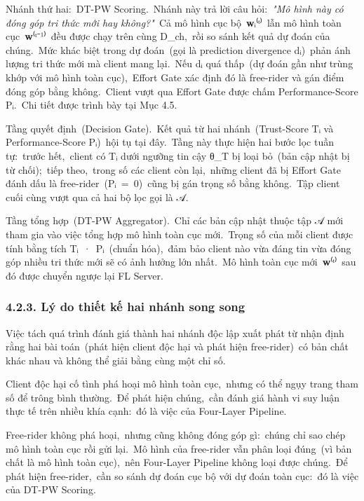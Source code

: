 Nhánh thứ hai:~DT-PW Scoring.~Nhánh này trả lời câu hỏi:~\emph{"Mô hình này có đóng góp tri thức mới hay không?"}~Cả mô hình cục bộ~\textbf{w}ᵢ⁽ᵗ⁾~lẫn mô hình toàn cục~\textbf{w}⁽ᵗ⁻¹⁾~đều được chạy trên cùng D\_ch,~rồi so sánh kết quả dự đoán của chúng.~Mức khác biệt trong dự đoán~(gọi là prediction divergence dᵢ)~phản ánh lượng tri thức mới mà client mang lại.~Nếu dᵢ quá thấp~(dự đoán gần như trùng khớp với mô hình toàn cục),~Effort Gate xác định đó là free-rider và gán điểm đóng góp bằng không.~Client vượt qua Effort Gate được chấm Performance-Score Pᵢ.~Chi tiết được trình bày tại Mục 4.5.

Tầng quyết định~(Decision Gate).~Kết quả từ hai nhánh~(Trust-Score Tᵢ và Performance-Score Pᵢ)~hội tụ tại đây.~Tầng này thực hiện hai bước lọc tuần tự:~trước hết,~client có Tᵢ dưới ngưỡng tin cậy θ\_T bị loại bỏ~(bản cập nhật bị từ chối);~tiếp theo,~trong số các client còn lại,~những client đã bị Effort Gate đánh dấu là free-rider~(Pᵢ~=~0)~cũng bị gán trọng số bằng không.~Tập client cuối cùng vượt qua cả hai bộ lọc gọi là 𝒜.

Tầng tổng hợp~(DT-PW Aggregator).~Chỉ các bản cập nhật thuộc tập 𝒜 mới tham gia vào việc tổng hợp mô hình toàn cục mới.~Trọng số của mỗi client được tính bằng tích Tᵢ~·~Pᵢ~(chuẩn hóa),~đảm bảo client nào vừa đáng tin vừa đóng góp nhiều tri thức mới sẽ có ảnh hưởng lớn nhất.~Mô hình toàn cục mới~\textbf{w}⁽ᵗ⁾~sau đó được chuyển ngược lại FL Server.

\subsubsection{4.2.3. Lý do thiết kế hai nhánh song song}\label{luxfd-do-thiux1ebft-kux1ebf-hai-nhuxe1nh-song-song}

Việc tách quá trình đánh giá thành hai nhánh độc lập xuất phát từ nhận định rằng hai bài toán~(phát hiện client độc hại và phát hiện free-rider)~có bản chất khác nhau và không thể giải bằng cùng một chỉ số.

Client độc hại cố tình phá hoại mô hình toàn cục,~nhưng có thể ngụy trang tham số để trông bình thường.~Để phát hiện chúng,~cần đánh giá hành vi suy luận thực tế trên nhiều khía cạnh:~đó là việc của Four-Layer Pipeline.

Free-rider không phá hoại,~nhưng cũng không đóng góp gì:~chúng chỉ sao chép mô hình toàn cục rồi gửi lại.~Mô hình của free-rider vẫn phân loại đúng~(vì bản chất là mô hình toàn cục),~nên Four-Layer Pipeline không loại được chúng.~Để phát hiện free-rider,~cần so sánh dự đoán cục bộ với dự đoán toàn cục:~đó là việc của DT-PW Scoring.

